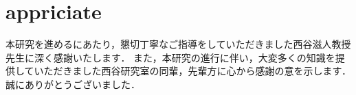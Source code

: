 \chapter*{appriciate}
本研究を進めるにあたり，懇切丁寧なご指導をしていただきました西谷滋人教授先生に深く感謝いたします． また，本研究の進行に伴い，大変多くの知識を提供していただきました西谷研究室の同輩，先輩方に心から感謝の意を示します． 誠にありがとうございました．